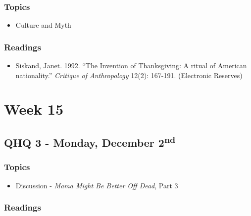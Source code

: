 \documentclass[]{book}
\providecommand{\tightlist}{%
  \setlength{\itemsep}{0pt}\setlength{\parskip}{0pt}}
\begin{document}
\hypertarget{topics-27}{%
\subsubsection*{Topics}\label{topics-27}}

\begin{itemize}
\tightlist
\item
  Culture and Myth
\end{itemize}

\hypertarget{readings-25}{%
\subsubsection*{Readings}\label{readings-25}}

\begin{itemize}
\tightlist
\item
  Siskand, Janet. 1992. ``The Invention of Thanksgiving: A ritual of American nationality.'' \emph{Critique of Anthropology} 12(2): 167-191. (Electronic Reserves)
\end{itemize}

\hypertarget{week-15}{%
\section*{Week 15}\label{week-15}}

\hypertarget{qhq-3---monday-december-2nd}{%
\subsection*{\texorpdfstring{QHQ 3 - Monday, December 2\textsuperscript{nd}}{QHQ 3 - Monday, December 2nd}}\label{qhq-3---monday-december-2nd}}

\hypertarget{topics-28}{%
\subsubsection*{Topics}\label{topics-28}}

\begin{itemize}
\tightlist
\item
  Discussion - \emph{Mama Might Be Better Off Dead}, Part 3
\end{itemize}

\hypertarget{readings-26}{%
\subsubsection*{Readings}\label{readings-26}}
\end{document}

